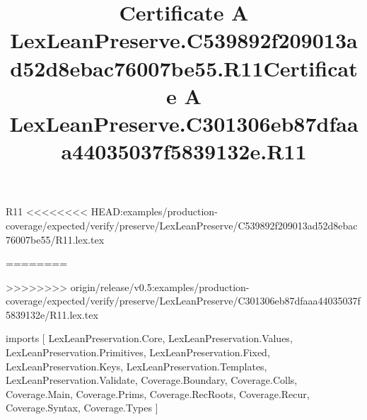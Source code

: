 \begin{lexlean}{R11}
<<<<<<<< HEAD:examples/production-coverage/expected/verify/preserve/LexLeanPreserve/C539892f209013ad52d8ebac76007be55/R11.lex.tex
\title{Certificate A LexLeanPreserve.C539892f209013ad52d8ebac76007be55.R11}
========
\title{Certificate A LexLeanPreserve.C301306eb87dfaaa44035037f5839132e.R11}
>>>>>>>> origin/release/v0.5:examples/production-coverage/expected/verify/preserve/LexLeanPreserve/C301306eb87dfaaa44035037f5839132e/R11.lex.tex
\begin{coremodule}
imports [
  LexLeanPreservation.Core,
  LexLeanPreservation.Values,
  LexLeanPreservation.Primitives,
  LexLeanPreservation.Fixed,
  LexLeanPreservation.Keys,
  LexLeanPreservation.Templates,
  LexLeanPreservation.Validate,
  Coverage.Boundary,
  Coverage.Colls,
  Coverage.Main,
  Coverage.Prims,
  Coverage.RecRoots,
  Coverage.Recur,
  Coverage.Syntax,
  Coverage.Types
]


\end{coremodule}
\end{lexlean}
